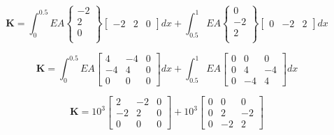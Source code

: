         \begin{equation*}
            \mathbf{K} = \int_0^{0.5} EA 
            \begin{Bmatrix}
            -2\\
            2\\
            0\\
            \end{Bmatrix}
            \begin{bmatrix}
            -2 &
            2 &
            0
            \end{bmatrix} dx + \int_{0.5}^{1} EA 
            \begin{Bmatrix}
            0\\
            -2\\
            2\\
            \end{Bmatrix}
            \begin{bmatrix}
            0 &
            -2 &
            2
            \end{bmatrix} dx
        \end{equation*}

        \begin{equation*}
            \mathbf{K} = \int_0^{0.5} EA 
            \begin{bmatrix}
            4 & -4 & 0\\
            -4 & 4 & 0\\
            0 & 0 & 0
            \end{bmatrix} dx + 
            \int_{0.5}^{1} EA 
            \begin{bmatrix}
            0 & 0 & 0 \\
            0 & 4 & -4 \\
            0 & -4 & 4
            \end{bmatrix} dx
        \end{equation*}

        \begin{equation*}
            \mathbf{K} = 10^3 
            \begin{bmatrix}
            2 & -2 & 0\\
            -2 & 2 & 0\\
            0 & 0 & 0
            \end{bmatrix} + 
            10^3 
            \begin{bmatrix}
            0 & 0 & 0 \\
            0 & 2 & -2 \\
            0 & -2 & 2
            \end{bmatrix}
        \end{equation*}


